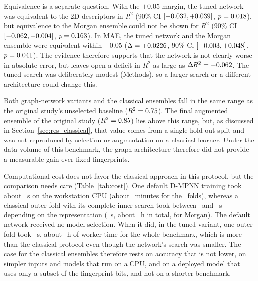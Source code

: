 Equivalence is a separate question. With the $\pm 0.05$ margin, the tuned network was equivalent to the 2D descriptors in $R^2$ (90\% CI $[-0.032, +0.039]$, $p = 0.018$), but equivalence to the Morgan ensemble could not be shown for $R^2$ (90\% CI $[-0.062, -0.004]$, $p = 0.163$). In MAE, the tuned network and the Morgan ensemble were equivalent within $\pm 0.05$ ($\Delta = +0.0226$, 90\% CI $[-0.003, +0.048]$, $p = 0.041$). The evidence therefore supports that the network is not clearly worse in absolute error, but leaves open a deficit in $R^2$ as large as $\Delta R^2 = -0.062$. The tuned search was deliberately modest (Methods), so a larger search or a different architecture could change this.

Both graph-network variants and the classical ensembles fall in the same range as the original study's unselected baseline ($R^2 = 0.75$). The final augmented ensemble of the original study ($R^2 = 0.85$) lies above this range, but, as discussed in Section~\ref{sec:res_classical}, that value comes from a single hold-out split and was not reproduced by selection or augmentation on a classical learner. Under the data volume of this benchmark, the graph architecture therefore did not provide a measurable gain over fixed fingerprints.

Computational cost does not favor the classical approach in this protocol, but the comparison needs care (Table~\ref{tab:cost}). One default D-MPNN training took about \GnnFoldSecMean\ s on the workstation CPU (about \GnnTotalMin\ minutes for the \TotalOuterFolds\ folds), whereas a classical outer fold with its complete inner search took between \ClassicalFoldSecMin\ and \ClassicalFoldSecMax\ s depending on the representation (\ClassicalMorganFoldSec\ s, about \ClassicalMorganTotalHours\ h in total, for Morgan). The default network received no model selection. When it did, in the tuned variant, one outer fold took \GnnTunedFoldSecMean\ s, about \GnnTunedTotalHours\ h of worker time for the whole benchmark, which is more than the classical protocol even though the network's search was smaller. The case for the classical ensembles therefore rests on accuracy that is not lower, on simpler inputs and models that run on a CPU, and on a deployed model that uses only a subset of the fingerprint bits, and not on a shorter benchmark.

